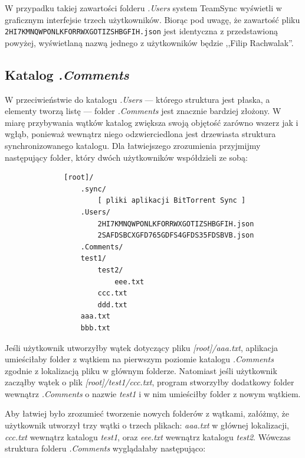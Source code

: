 \documentclass[polish,a4paper,twoside]{ppfcmthesis}
\begin{document}
W przypadku takiej zawartości folderu \emph{.Users} system TeamSync wyświetli w graficznym interfejsie trzech użytkowników. Biorąc pod uwagę, że zawartość pliku \texttt{2HI7KMNQWPONLKFORRWXGOTIZSHBGFIH.json} jest identyczna z przedstawioną powyżej, wyświetlaną nazwą jednego z użytkowników będzie ,,Filip Rachwalak''.

\subsection{Katalog \emph{.Comments}}

W przeciwieństwie do katalogu \emph{.Users} --- którego struktura jest płaska, a elementy tworzą listę --- folder \emph{.Comments} jest znacznie bardziej złożony. W miarę przybywania wątków katalog zwiększa swoją objętość zarówno wszerz jak i wgłąb, ponieważ wewnątrz niego odzwierciedlona jest drzewiasta struktura synchronizowanego katalogu. Dla łatwiejszego zrozumienia przyjmijmy następujący folder, który dwóch użytkowników współdzieli ze sobą:

\begin{minipage}{\linewidth}
\vspace{1em}
\begin{verbatim}
              [root]/
                  .sync/
                      [ pliki aplikacji BitTorrent Sync ]
                  .Users/
                      2HI7KMNQWPONLKFORRWXGOTIZSHBGFIH.json
                      2SAFDSBCXGFD765GDFS4GFDS35FDSBVB.json
                  .Comments/
                  test1/
                      test2/
                          eee.txt
                      ccc.txt
                      ddd.txt
                  aaa.txt
                  bbb.txt
\end{verbatim}
\vspace{1em}
\end{minipage}

Jeśli użytkownik utworzyłby wątek dotyczący pliku \emph{[root]/aaa.txt}, aplikacja umieściłaby folder z wątkiem na pierwszym poziomie katalogu \emph{.Comments} zgodnie z lokalizacją pliku w głównym folderze. Natomiast jeśli użytkownik zacząłby wątek o plik \emph{[root]/test1/ccc.txt}, program stworzyłby dodatkowy folder wewnątrz \emph{.Comments} o nazwie \emph{test1} i w nim umieściłby folder z nowym wątkiem.

Aby łatwiej było zrozumieć tworzenie nowych folderów z wątkami, załóżmy, że użytkownik utworzył trzy wątki o trzech plikach: \emph{aaa.txt} w głównej lokalizacji, \emph{ccc.txt} wewnątrz katalogu \emph{test1}, oraz \emph{eee.txt} wewnątrz katalogu \emph{test2}. Wówczas struktura folderu \emph{.Comments} wyglądałaby następująco:
\end{document}
